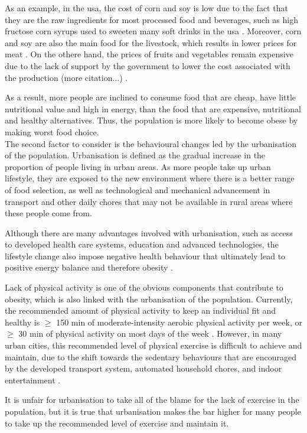 As an example, in the \gls{usa}, the cost of corn and soy is low due to the fact that they are the raw ingredients for most processed food and beverages, such as high fructose corn syrups used to sweeten many soft drinks in the \gls{usa} \citep{Malik2013}.
Moreover, corn and soy are also the main food for the livestock, which results in lower prices for meat \citep{Malik2013}.
On the othere hand, the prices of fruits and vegetables remain expensive due to the lack of support by the government to lower the cost associated with the production (more citation...) \citep{Malik2013}.

As a result, more people are inclined to consume food that are cheap, have little nutritional value and high in energy, than the food that are expensive, nutritional and healthy alternatives.
Thus, the population is more likely to become obese by making worst food choice.\\

\noindent
The second factor to consider is the behavioural changes led by the urbanisation of the population.
Urbanisation is defined as the gradual increase in the proportion of people living in urban areas.
As more people take up urban lifestyle, they are exposed to the new environment where there is a better range of food selection, as well as technological and mechanical advancement in transport and other daily chores that may not be available in rural areas where these people come from.

Although there are many advantages involved with urbanisation, such as access to developed health care systems, education and advanced technologies, the lifestyle change also impose negative health behaviour that ultimately lead to positive energy balance and therefore obesity \citep{Malik2013}.

Lack of physical activity is one of the obvious components that contribute to obesity, which is also linked with the urbanisation of the population.
Currently, the recommended amount of physical activity to keep an individual fit and healthy is $\geq$ 150 min of moderate-intensity aerobic physical activity per week, or $\geq$ 30 min of physical activity on most days of the week \citep{Pate1995, WHO2010}.
However, in many urban cities, this recommended level of physical exercise is difficult to achieve and maintain, due to the shift towards the sedentary behaviours that are encouraged by the developed transport system, automated household chores, and indoor entertainment \citep{Malik2013}.

It is unfair for urbanisation to take all of the blame for the lack of exercise in the population, but it is true that urbanisation makes the bar higher for many people to take up the recommended level of exercise and maintain it.\\

